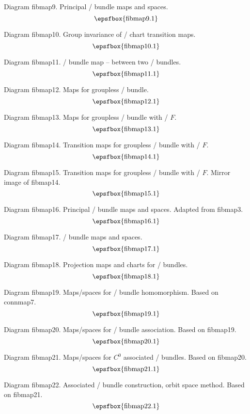 Diagram fibmap9. Principal \fibre/ bundle maps and spaces.
$$
\centerline{\epsfbox{fibmap9.1}}
$$

Diagram fibmap10. Group invariance of \fibre/ chart transition maps.
$$
\centerline{\epsfbox{fibmap10.1}}
$$

Diagram fibmap11. \Fibre/ bundle map -- between two \fibre/ bundles.
$$
\centerline{\epsfbox{fibmap11.1}}
$$

\filleject

Diagram fibmap12. Maps for groupless \fibre/ bundle.
$$
\centerline{\epsfbox{fibmap12.1}}
$$

Diagram fibmap13. Maps for groupless \fibre/ bundle with \fibre/ $F$.
$$
\centerline{\epsfbox{fibmap13.1}}
$$

Diagram fibmap14. Transition maps for groupless \fibre/ bundle with \fibre/ $F$.
$$
\centerline{\epsfbox{fibmap14.1}}
$$

\filleject

Diagram fibmap15. Transition maps for groupless \fibre/ bundle with \fibre/ $F$.
Mirror image of fibmap14.
$$
\centerline{\epsfbox{fibmap15.1}}
$$

Diagram fibmap16. Principal \fibre/ bundle maps and spaces. Adapted from
fibmap3.
$$
\centerline{\epsfbox{fibmap16.1}}
$$

Diagram fibmap17. \Fibre/ bundle maps and spaces.
$$
\centerline{\epsfbox{fibmap17.1}}
$$

\filleject

Diagram fibmap18. Projection maps and charts for \fibre/ bundles.
$$
\centerline{\epsfbox{fibmap18.1}}
$$

Diagram fibmap19. Maps/spaces for \fibre/ bundle homomorphism. Based on
connmap7.
$$
\centerline{\epsfbox{fibmap19.1}}
$$

Diagram fibmap20. Maps/spaces for \fibre/ bundle association. Based on fibmap19.
$$
\centerline{\epsfbox{fibmap20.1}}
$$

\filleject

Diagram fibmap21. Maps/spaces for $C^0$ associated \fibre/ bundles. Based on
fibmap20.
$$
\centerline{\epsfbox{fibmap21.1}}
$$

Diagram fibmap22. Associated \fibre/ bundle construction, orbit space method.
Based on fibmap21.
$$
\centerline{\epsfbox{fibmap22.1}}
$$


